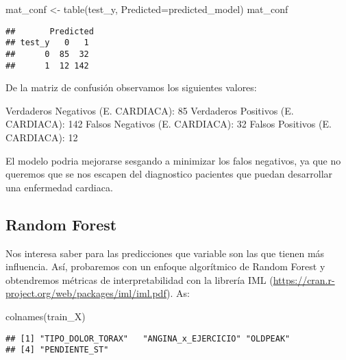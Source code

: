 \documentclass[
]{article}
\newenvironment{Shaded}{\begin{snugshade}}{\end{snugshade}}
\newcommand{\AttributeTok}[1]{\textcolor[rgb]{0.80,0.80,0.80}{#1}}
\newcommand{\FunctionTok}[1]{\textcolor[rgb]{0.94,0.94,0.56}{#1}}
\newcommand{\NormalTok}[1]{\textcolor[rgb]{0.80,0.80,0.80}{#1}}
\newcommand{\OtherTok}[1]{\textcolor[rgb]{0.94,0.94,0.56}{#1}}
\begin{document}
\begin{Shaded}
\begin{Highlighting}[]
\NormalTok{mat\_conf }\OtherTok{\textless{}{-}} \FunctionTok{table}\NormalTok{(test\_y, }\AttributeTok{Predicted=}\NormalTok{predicted\_model)}
\NormalTok{mat\_conf}
\end{Highlighting}
\end{Shaded}

\begin{verbatim}
##       Predicted
## test_y   0   1
##      0  85  32
##      1  12 142
\end{verbatim}

De la matriz de confusión observamos los siguientes valores:

Verdaderos Negativos (E. CARDIACA): 85 Verdaderos Positivos (E.
CARDIACA): 142 Falsos Negativos (E. CARDIACA): 32 Falsos Positivos (E.
CARDIACA): 12

El modelo podria mejorarse sesgando a minimizar los falos negativos, ya
que no queremos que se nos escapen del diagnostico pacientes que puedan
desarrollar una enfermedad cardiaca.

\hypertarget{random-forest}{%
\subsection{Random Forest}\label{random-forest}}

Nos interesa saber para las predicciones que variable son las que tienen
más influencia. Así, probaremos con un enfoque algorítmico de Random
Forest y obtendremos métricas de interpretabilidad con la librería IML
(\url{https://cran.r-project.org/web/packages/iml/iml.pdf}). As:

\begin{Shaded}
\begin{Highlighting}[]
\FunctionTok{colnames}\NormalTok{(train\_X)}
\end{Highlighting}
\end{Shaded}

\begin{verbatim}
## [1] "TIPO_DOLOR_TORAX"   "ANGINA_x_EJERCICIO" "OLDPEAK"           
## [4] "PENDIENTE_ST"
\end{verbatim}
\end{document}

